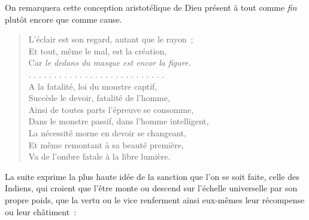 \documentclass[french,twoside]{book} %
\begin{document}
\noindent On remarquera cette conception aristotélique de Dieu présent à tout comme \emph{fin} plutôt encore que comme cause.\par


\begin{verse}
L’éclair est son regard, autant que le rayon ;\\
Et tout, même le mal, est la création,\\
Car \emph{le dedans du masque est encor la figure.}\\
. . . . . . . . . . . . . . . . . . . . . . . . . . .\\
A la fatalité, loi du monstre captif,\\
Succède le devoir, fatalité de l’homme,\\
Ainsi de toutes parts l’épreuve se consomme,\\
Dans le monstre passif, dans l’homme intelligent,\\
La nécessité morne en devoir se changeant,\\
Et même remontant à sa beauté première,\\
Va de l’ombre fatale à la libre lumière.\\
\end{verse}

\noindent La suite exprime la plus haute idée de la sanction que l’on se soit faite, celle des Indiens, qui croient que l’être monte ou descend sur l’échelle universelle par son propre poids, que la vertu ou le vice renferment ainsi eux-mêmes leur récompense ou leur châtiment :\par
\end{document}
